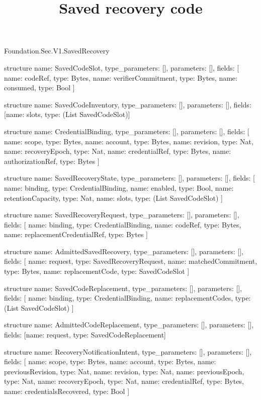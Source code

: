 \begin{lexlean}{Foundation.Sec.V1.SavedRecovery}
\title{Saved recovery code}
\begin{semanticmodule}
structure{
  name: SavedCodeSlot,
  type_parameters: [],
  parameters: [],
  fields: [
    {name: codeRef, type: Bytes},
    {name: verifierCommitment, type: Bytes},
    {name: consumed, type: Bool}
  ]
}

structure{
  name: SavedCodeInventory,
  type_parameters: [],
  parameters: [],
  fields: [{name: slots, type: (List SavedCodeSlot)}]
}

structure{
  name: CredentialBinding,
  type_parameters: [],
  parameters: [],
  fields: [
    {name: scope, type: Bytes},
    {name: account, type: Bytes},
    {name: revision, type: Nat},
    {name: recoveryEpoch, type: Nat},
    {name: credentialRef, type: Bytes},
    {name: authorizationRef, type: Bytes}
  ]
}

structure{
  name: SavedRecoveryState,
  type_parameters: [],
  parameters: [],
  fields: [
    {name: binding, type: CredentialBinding},
    {name: enabled, type: Bool},
    {name: retentionCapacity, type: Nat},
    {name: slots, type: (List SavedCodeSlot)}
  ]
}

structure{
  name: SavedRecoveryRequest,
  type_parameters: [],
  parameters: [],
  fields: [
    {name: binding, type: CredentialBinding},
    {name: codeRef, type: Bytes},
    {name: replacementCredentialRef, type: Bytes}
  ]
}

structure{
  name: AdmittedSavedRecovery,
  type_parameters: [],
  parameters: [],
  fields: [
    {name: request, type: SavedRecoveryRequest},
    {name: matchedCommitment, type: Bytes},
    {name: replacementCode, type: SavedCodeSlot}
  ]
}

structure{
  name: SavedCodeReplacement,
  type_parameters: [],
  parameters: [],
  fields: [
    {name: binding, type: CredentialBinding},
    {name: replacementCodes, type: (List SavedCodeSlot)}
  ]
}

structure{
  name: AdmittedCodeReplacement,
  type_parameters: [],
  parameters: [],
  fields: [{name: request, type: SavedCodeReplacement}]
}

structure{
  name: RecoveryNotificationIntent,
  type_parameters: [],
  parameters: [],
  fields: [
    {name: scope, type: Bytes},
    {name: account, type: Bytes},
    {name: previousRevision, type: Nat},
    {name: revision, type: Nat},
    {name: previousEpoch, type: Nat},
    {name: recoveryEpoch, type: Nat},
    {name: credentialRef, type: Bytes},
    {name: credentialsRecovered, type: Bool}
  ]
}


\end{semanticmodule}
\end{lexlean}
